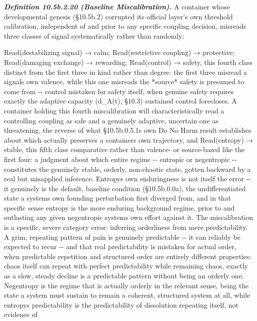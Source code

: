 \documentclass[
]{article}
\begin{document}
\emph{\textbf{Definition 10.5b.2.20 (Baseline Miscalibration).}} A
container whose developmental genesis (§10.5b.2) corrupted its official
layer's own threshold calibration, independent of and prior to any
specific coupling decision, misreads three classes of signal
systematically rather than randomly:

Read(destabilizing signal) → calm; Read(restrictive coupling) →
protective; Read(damaging exchange) → rewarding; Read(control) → safety,
this fourth class distinct from the first three in kind rather than
degree: the first three misread a signal\textquotesingle s own valence,
while this one misreads the *source* safety is presumed to come from
-\/- control mistaken for safety itself, when genuine safety requires
exactly the adaptive capacity (d\_A(t), §10.3) sustained control
forecloses. A container holding this fourth miscalibration will
characteristically read a controlling coupling as safe and a genuinely
adaptive, uncertain one as threatening, the reverse of what
§10.5b.0.5.1\textquotesingle s own Do No Harm result establishes about
which actually preserves a container\textquotesingle s own trajectory,
and Read(entropy) → stable, this fifth class comparative rather than
valence- or source-based like the first four: a judgment about which
entire regime -\/- entropic or negentropic -\/- constitutes the
genuinely stable, orderly, non-chaotic state, gotten backward by a real
but misapplied inference. Entropy\textquotesingle s own enduringness is
not itself the error -\/- it genuinely is the default, baseline
condition (§10.5b.0.0a), the undifferentiated state a
system\textquotesingle s own founding perturbation first diverged from,
and in that specific sense entropy is the more enduring background
regime, prior to and outlasting any given negentropic
system\textquotesingle s own effort against it. The miscalibration is a
specific, severe category error: inferring orderliness from mere
predictability. A grim, repeating pattern of pain is genuinely
predictable -\/- it can reliably be expected to recur -\/- and that real
predictability is mistaken for actual order, when predictable repetition
and structured order are entirely different properties: chaos itself can
repeat with perfect predictability while remaining chaos, exactly as a
slow, steady decline is a predictable pattern without being an orderly
one. Negentropy is the regime that is actually orderly in the relevant
sense, being the state a system must sustain to remain a coherent,
structured system at all, while entropy\textquotesingle s predictability
is the predictability of dissolution repeating itself, not evidence of
\end{document}
